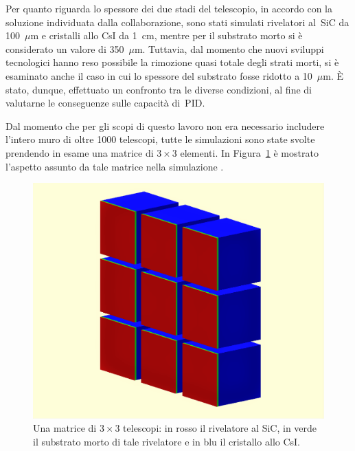 Per quanto riguarda lo spessore dei due stadi del telescopio, in accordo con la soluzione individuata dalla collaborazione, sono stati simulati rivelatori al~SiC da 100~$\mu$m e cristalli allo CsI da 1~cm, mentre per il substrato morto si è considerato un valore di 350~$\mu$m.
Tuttavia, dal momento che nuovi sviluppi tecnologici hanno reso possibile la rimozione quasi totale degli strati morti, si è esaminato anche il caso in cui lo spessore del substrato fosse ridotto a 10~$\mu$m. 
È stato, dunque, effettuato un confronto tra le diverse condizioni, al fine di valutarne le conseguenze sulle capacità di~PID.





Dal momento che per gli scopi di questo lavoro non era necessario includere l'intero muro di oltre 1000 telescopi, tutte le simulazioni sono state svolte prendendo in esame una matrice di $3 \times 3$ elementi.
In Figura~\ref{fig:simulazione_muro} è mostrato l'aspetto assunto da tale matrice nella simulazione \geant. 

\begin{figure} [!p]
	\centering
	\includegraphics[width=\textwidth, keepaspectratio]{Grafici/wall11_ritagliato_schiarito.png}
	\caption{Una matrice di $3 \times 3$ telescopi: in rosso il rivelatore al SiC, in verde il substrato morto di tale rivelatore e in blu il cristallo allo CsI.} \label{fig:simulazione_muro}
\end{figure}


